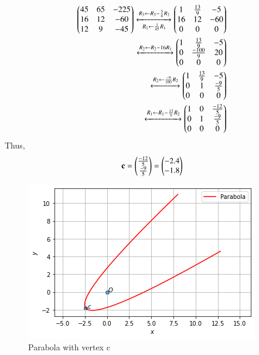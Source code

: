 \begin{align}
    \begin{pmatrix}45 & 65 & -225\\16 & 12 & -60\\12 & 9 & -45\end{pmatrix}\xleftrightarrow[R_1\leftarrow \frac{1}{45}R_1]{R_3\leftarrow R_3-\frac{3}{4}R_2}\begin{pmatrix}1 & \frac{13}{9} & -5\\16 & 12 & -60\\0&0&0\end{pmatrix}\\
    \xleftrightarrow{R_2\leftarrow R_2-16R_1}\begin{pmatrix}1 & \frac{13}{9} & -5\\0 & \frac{-100}{9} & 20\\0&0&0\end{pmatrix}\\\xleftrightarrow{R_2\leftarrow \frac{-9}{100}R_2}\begin{pmatrix}1 & \frac{13}{9} & -5\\0 & 1 & \frac{-9}{5}\\0&0&0\end{pmatrix}\\\xleftrightarrow{R_1\leftarrow R_1-\frac{13}{9}R_2}\begin{pmatrix}1 & 0 & \frac{-12}{5}\\0 & 1 & \frac{-9}{5}\\0&0&0\end{pmatrix}
\end{align}
Thus,
\begin{align}
    \mathbf{c} = \begin{pmatrix}\frac{-12}{5}\\\frac{-9}{5}\end{pmatrix} = \begin{pmatrix}-2.4 \\ -1.8\end{pmatrix}
\end{align}
\begin{figure}[h!]
    \centering
    \includegraphics[width=\columnwidth]{./solutions/41/4/assignment5parabola.png}
    \caption{Parabola with vertex c}
    \label{eq:solutions/41/4/fig:fig1}
\end{figure}

